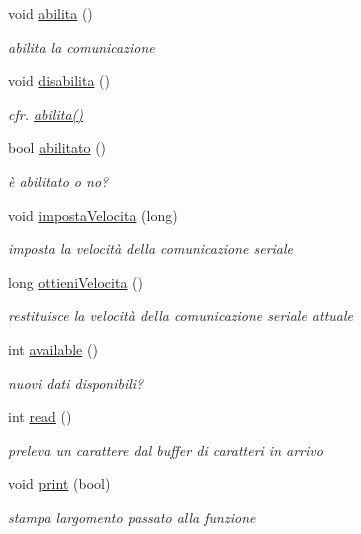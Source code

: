 \begin{DoxyCompactItemize}
void \hyperlink{class_comunicazione_a08e76063956fc38d54002d8f17786cb6}{abilita} ()
\begin{DoxyCompactList}\small\item\em abilita la comunicazione \end{DoxyCompactList}\item 
void \hyperlink{class_comunicazione_a5758b730adbaec6af47d44373d8dce3b}{disabilita} ()
\begin{DoxyCompactList}\small\item\em cfr. {\ttfamily \hyperlink{class_comunicazione_a08e76063956fc38d54002d8f17786cb6}{abilita()}} \end{DoxyCompactList}\item 
bool \hyperlink{class_comunicazione_a1539a3f6cc41da10ac5b1b41493ce94d}{abilitato} ()
\begin{DoxyCompactList}\small\item\em è abilitato o no? \end{DoxyCompactList}\item 
void \hyperlink{class_comunicazione_aaded119b9f77b77bcf214243c4b89f36}{imposta\+Velocita} (long)
\begin{DoxyCompactList}\small\item\em imposta la velocità della comunicazione seriale \end{DoxyCompactList}\item 
long \hyperlink{class_comunicazione_a6fd31edb993b9909e0aa176e9f270e92}{ottieni\+Velocita} ()
\begin{DoxyCompactList}\small\item\em restituisce la velocità della comunicazione seriale attuale \end{DoxyCompactList}\item 
int \hyperlink{class_comunicazione_a78272d5101baaebf7470d6c5bbcd38c2}{available} ()
\begin{DoxyCompactList}\small\item\em nuovi dati disponibili? \end{DoxyCompactList}\item 
int \hyperlink{class_comunicazione_a0901013668cd1ec2eac99f6127856f85}{read} ()
\begin{DoxyCompactList}\small\item\em preleva un carattere dal buffer di caratteri in arrivo \end{DoxyCompactList}\item 
void \hyperlink{class_comunicazione_ab6c02b2d02cf67af2b090b1a960cad7d}{print} (bool)
\begin{DoxyCompactList}\small\item\em stampa l\textquotesingle{}argomento passato alla funzione \end{DoxyCompactList}\item 

\end{DoxyCompactItemize}
